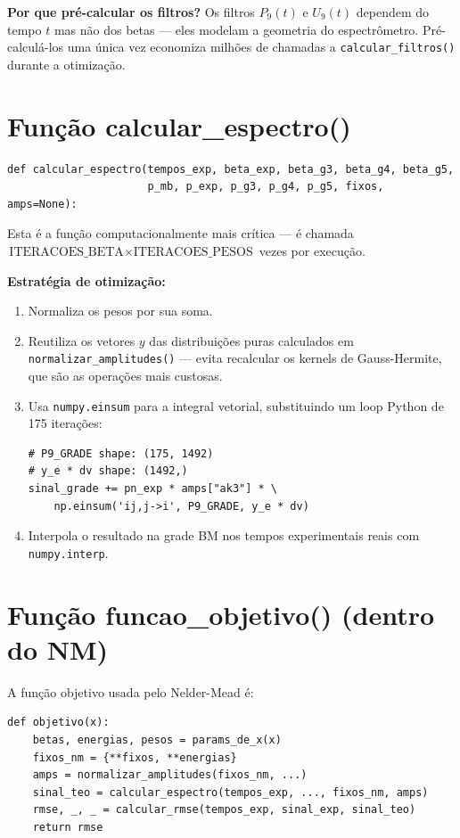 \documentclass[12pt,a4paper]{report}
\newcommand{\code}[1]{\texttt{#1}}
\begin{document}
\textbf{Por que pré-calcular os filtros?} Os filtros $P_9(t)$ e $U_9(t)$
dependem do tempo $t$ mas não dos betas — eles modelam a geometria do
espectrômetro. Pré-calculá-los uma única vez economiza milhões de chamadas
a \code{calcular\_filtros()} durante a otimização.

\section{Função calcular\_espectro()}

\begin{lstlisting}[caption={Assinatura de calcular\_espectro()}]
def calcular_espectro(tempos_exp, beta_exp, beta_g3, beta_g4, beta_g5,
                      p_mb, p_exp, p_g3, p_g4, p_g5, fixos, amps=None):
\end{lstlisting}

Esta é a função computacionalmente mais crítica — é chamada
$\text{ITERACOES\_BETA} \times \text{ITERACOES\_PESOS}$ vezes por execução.

\textbf{Estratégia de otimização:}
\begin{enumerate}
  \item Normaliza os pesos por sua soma.
  \item Reutiliza os vetores $y$ das distribuições puras calculados em
    \code{normalizar\_amplitudes()} — evita recalcular os kernels de
    Gauss-Hermite, que são as operações mais custosas.
  \item Usa \texttt{numpy.einsum} para a integral vetorial, substituindo
    um loop Python de 175 iterações:
    \begin{lstlisting}[caption={Integração vetorial com einsum}]
# P9_GRADE shape: (175, 1492)
# y_e * dv shape: (1492,)
sinal_grade += pn_exp * amps["ak3"] * \
    np.einsum('ij,j->i', P9_GRADE, y_e * dv)
    \end{lstlisting}
  \item Interpola o resultado na grade BM nos tempos experimentais reais
    com \texttt{numpy.interp}.
\end{enumerate}

\section{Função funcao\_objetivo() (dentro do NM)}

A função objetivo usada pelo Nelder-Mead é:
\begin{lstlisting}[caption={Função objetivo do Nelder-Mead}]
def objetivo(x):
    betas, energias, pesos = params_de_x(x)
    fixos_nm = {**fixos, **energias}
    amps = normalizar_amplitudes(fixos_nm, ...)
    sinal_teo = calcular_espectro(tempos_exp, ..., fixos_nm, amps)
    rmse, _, _ = calcular_rmse(tempos_exp, sinal_exp, sinal_teo)
    return rmse
\end{lstlisting}
\end{document}
